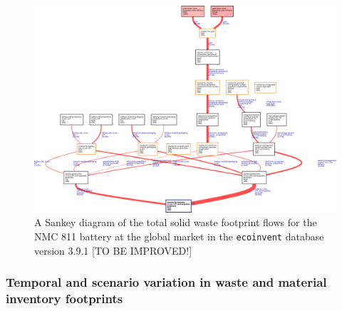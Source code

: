 \begin{figure}[H]
    \centering
    \includegraphics[width=19cm]{figures/T-reX_LFP_chromium.png}
    \caption{A Sankey diagram of the total solid waste footprint flows for the NMC 811 battery at the global market in the \texttt{ecoinvent} database version 3.9.1 [TO BE IMPROVED!]}\label{fig:sankey_waste}
\end{figure}




\subsubsection{Temporal and scenario variation in waste and material inventory footprints}

